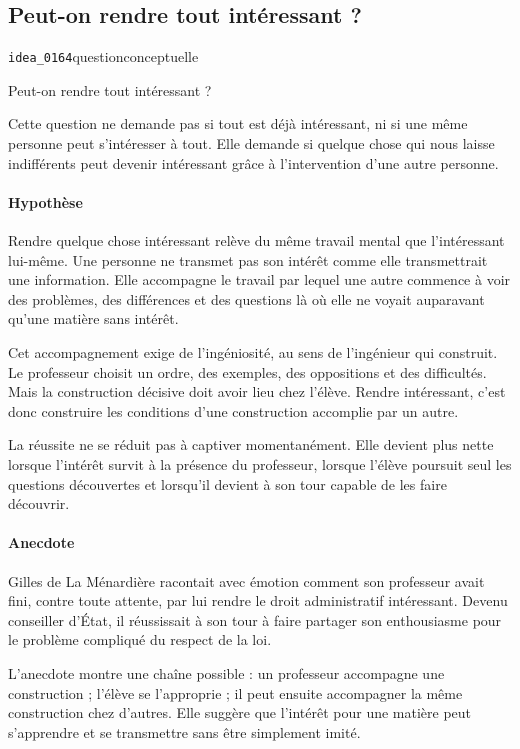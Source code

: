\documentclass[10pt,a4paper]{article}
\begin{document}
\subsection{Peut-on rendre tout intéressant ?}
{\small\color{metadata} \texttt{idea\_0164}\quad\textbullet\quad question\quad\textbullet\quad conceptuelle\par}

Peut-on rendre tout intéressant ?

Cette question ne demande pas si tout est déjà intéressant, ni si une même personne peut s'intéresser à tout. Elle demande si quelque chose qui nous laisse indifférents peut devenir intéressant grâce à l'intervention d'une autre personne.

\paragraph{Hypothèse}
Rendre quelque chose intéressant relève du même travail mental que l'intéressant lui-même. Une personne ne transmet pas son intérêt comme elle transmettrait une information. Elle accompagne le travail par lequel une autre commence à voir des problèmes, des différences et des questions là où elle ne voyait auparavant qu'une matière sans intérêt.

Cet accompagnement exige de l'ingéniosité, au sens de l'ingénieur qui construit. Le professeur choisit un ordre, des exemples, des oppositions et des difficultés. Mais la construction décisive doit avoir lieu chez l'élève. Rendre intéressant, c'est donc construire les conditions d'une construction accomplie par un autre.

La réussite ne se réduit pas à captiver momentanément. Elle devient plus nette lorsque l'intérêt survit à la présence du professeur, lorsque l'élève poursuit seul les questions découvertes et lorsqu'il devient à son tour capable de les faire découvrir.

\paragraph{Anecdote}
Gilles de La Ménardière racontait avec émotion comment son professeur avait fini, contre toute attente, par lui rendre le droit administratif intéressant. Devenu conseiller d'État, il réussissait à son tour à faire partager son enthousiasme pour le problème compliqué du respect de la loi.

L'anecdote montre une chaîne possible : un professeur accompagne une construction ; l'élève se l'approprie ; il peut ensuite accompagner la même construction chez d'autres. Elle suggère que l'intérêt pour une matière peut s'apprendre et se transmettre sans être simplement imité.
\end{document}
